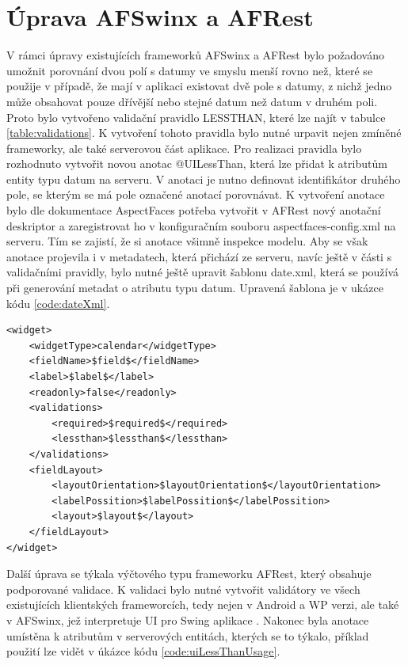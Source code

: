 \section{Úprava AFSwinx a AFRest}
V rámci úpravy existujících frameworků AFSwinx a AFRest \cite{tomasek-thesis} bylo požadováno umožnit porovnání dvou polí s datumy ve smyslu menší rovno než, které se použije v případě, že mají v aplikaci existovat dvě pole s datumy, z nichž jedno může obsahovat pouze dřívější nebo stejné datum než datum v druhém poli. Proto bylo vytvořeno validační pravidlo LESSTHAN, které lze najít v tabulce \ref{table:validations}. K vytvoření tohoto pravidla bylo nutné urpavit nejen zmíněné frameworky, ale také serverovou část aplikace. Pro realizaci pravidla bylo rozhodnuto vytvořit novou anotac @UILessThan, která lze přidat k atributům entity typu datum na serveru. V anotaci je nutno definovat identifikátor druhého pole, se kterým se má pole označené anotací porovnávat. K vytvoření anotace bylo dle dokumentace AspectFaces \cite{aspect-faces} potřeba vytvořit v AFRest nový anotační deskriptor a zaregistrovat ho v konfiguračním souboru aspectfaces-config.xml na serveru. Tím se zajistí, že si anotace všimně inspekce modelu. Aby se však anotace projevila i v metadatech, která přichází ze serveru, navíc ještě v části s validačními pravidly, bylo nutné ještě upravit šablonu date.xml, která se používá při generování metadat o atributu typu datum. Upravená šablona je v ukázce kódu \ref{code:dateXml}.

\begin{lstlisting}[caption=Upravená šablona date.xml,
label={code:dateXml}, basicstyle=\footnotesize]
<widget>
	<widgetType>calendar</widgetType>
	<fieldName>$field$</fieldName>
	<label>$label$</label>
	<readonly>false</readonly>
	<validations>
		<required>$required$</required>
		<lessthan>$lessthan$</lessthan>
	</validations>
	<fieldLayout>
		<layoutOrientation>$layoutOrientation$</layoutOrientation>
		<labelPossition>$labelPossition$</labelPossition>
		<layout>$layout$</layout>
	</fieldLayout>
</widget>
\end{lstlisting}

Další úprava se týkala výčtového typu frameworku AFRest, který obsahuje podporované validace. K validaci bylo nutné vytvořit validátory ve všech existujících klientských frameworcích, tedy nejen v Android a WP verzi, ale také v AFSwinx, jež interpretuje UI pro Swing aplikace \cite{tomasek-thesis}. Nakonec byla anotace umístěna k atributům v serverových entitách, kterých se to týkalo, příklad použití lze vidět v úkázce kódu \ref{code:uiLessThanUsage}.

